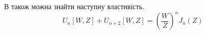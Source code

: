 В \cite{imp:Boersma1961} також можна знайти наступну властивість.
%
\begin{equation}
U_n \left[ W, Z \right] + U_{n+2} \left[ W, Z \right] = 
\left( \frac{W}{Z} \right)^n J_n (Z)
\end{equation}
%
%
%
%
%
%
